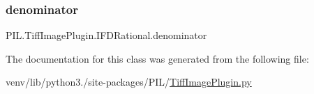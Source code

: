 \subsubsection{\texorpdfstring{denominator}{denominator}}
{\footnotesize\ttfamily P\+I\+L.\+Tiff\+Image\+Plugin.\+I\+F\+D\+Rational.\+denominator}



The documentation for this class was generated from the following file\+:\begin{DoxyCompactItemize}
\item 
venv/lib/python3./site-\/packages/\+P\+I\+L/\hyperlink{TiffImagePlugin_8py}{Tiff\+Image\+Plugin.\+py}\end{DoxyCompactItemize}
